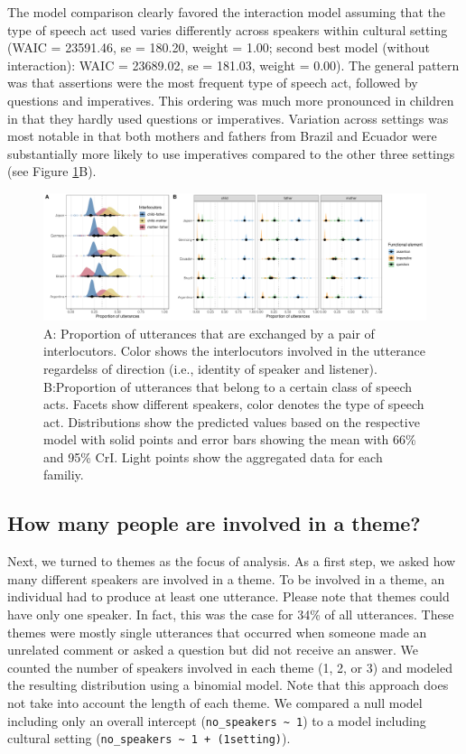 \documentclass[
  man,floatsintext]{apa6}
\begin{document}
The model comparison clearly favored the interaction model assuming that the type of speech act used varies differently across speakers within cultural setting (WAIC = 23591.46, se = 180.20, weight = 1.00; second best model (without interaction): WAIC = 23689.02, se = 181.03, weight = 0.00). The general pattern was that assertions were the most frequent type of speech act, followed by questions and imperatives. This ordering was much more pronounced in children in that they hardly used questions or imperatives. Variation across settings was most notable in that both mothers and fathers from Brazil and Ecuador were substantially more likely to use imperatives compared to the other three settings (see Figure \ref{fig:fig2}B).

\begin{figure}
\includegraphics[width=1\linewidth]{../visuals/fig2} \caption{A: Proportion of utterances that are exchanged by a pair of interlocutors. Color shows the interlocutors involved in the utterance regardelss of direction (i.e., identity of speaker and listener). B:Proportion of utterances that belong to a certain class of speech acts. Facets show different speakers, color denotes the type of speech act. Distributions show the predicted values based on the respective model with solid points and error bars showing the mean with 66\% and 95\% CrI. Light points show the aggregated data for each familiy.}\label{fig:fig2}
\end{figure}

\hypertarget{how-many-people-are-involved-in-a-theme}{%
\subsection{How many people are involved in a theme?}\label{how-many-people-are-involved-in-a-theme}}

Next, we turned to themes as the focus of analysis. As a first step, we asked how many different speakers are involved in a theme. To be involved in a theme, an individual had to produce at least one utterance. Please note that themes could have only one speaker. In fact, this was the case for 34\% of all utterances. These themes were mostly single utterances that occurred when someone made an unrelated comment or asked a question but did not receive an answer. We counted the number of speakers involved in each theme (1, 2, or 3) and modeled the resulting distribution using a binomial model. Note that this approach does not take into account the length of each theme. We compared a null model including only an overall intercept (\texttt{no\_speakers\ \textasciitilde{}\ 1}) to a model including cultural setting (\texttt{no\_speakers\ \textasciitilde{}\ 1\ +\ (1\textbar{}setting)}).
\end{document}
